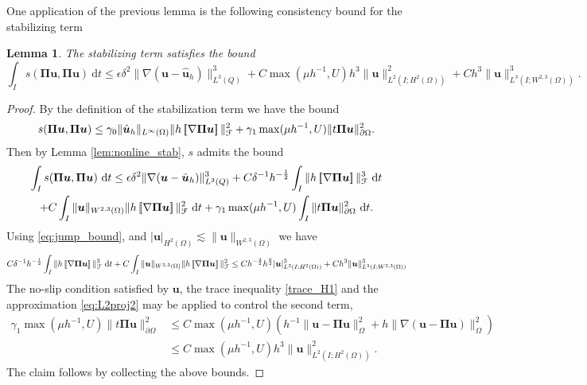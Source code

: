 \documentclass[10pt]{amsart}
\numberwithin{equation}{section}
\newtheorem{lemma}[theorem]{Lemma}
\theoremstyle{definition}
\theoremstyle{remark}
\renewcommand{\(}{\bigl(}
\renewcommand{\)}{\bigr)}
\newcommand{\jump}[1]{\left[\hspace{-0.025in}\left[#1\right]\hspace{-0.025in}\right]}
\newcommand{\bld}[1]{\boldsymbol{#1}}
\newcommand{\bu}{\bld{u}}
\newcommand{\bhu}{\hat{\bld{u}}}
\newcommand{\bPi}{\bld{\Pi}}
\begin{document}
%
One application of the previous lemma is the following consistency
bound for the stabilizing term
\begin{lemma}\label{lem:stab_consist}
The stabilizing term satisfies the bound
\[
\int_I s(\bPi \bu,\bPi \bu) ~\mbox{d}t \leq \epsilon
\delta^2 \|\nabla(\bu - \bhu_h)\|^3_{L^3(Q)}   + C \max(\mu h^{-1}, U)
 h^3 \|\bu\|_{L^2(I;H^2(\Omega))}^2 + C h^3  \|\bu\|_{L^3(I;W^{2,3}(\Omega))}^3.
\]
\end{lemma}
\begin{proof}
By the definition of the stabilization term we have the bound
\[
 s(\bPi \bu,\bPi \bu)\leq \gamma_0 \|
 \bhu_h\|_{L^{\infty}(\Omega)} \|h \jump{\nabla
   \bPi \bu}\|_{\mathcal{F}}^2 + \gamma_1 \max(\mu h^{-1}, U)\|t \bPi \bu\|^2_{\partial \Omega}.
\]
%
Then by Lemma \ref{lem:nonline_stab},
$s$ admits the bound
\begin{multline}\label{eq:stab_approx_nonlin}
\int_I  s(\bPi \bu,\bPi \bu) ~\mbox{d}t \leq \epsilon
\delta^2 \|\nabla (\bu - \bhu_h)\|^3_{L^3(Q)} + C
\delta^{-1} h^{-\frac{1}{2}}\int_I   \|h \jump{\nabla
   \bPi \bu}\|_{\mathcal{F}}^3 ~\mbox{d}t\\
 +C \int_I \|\bu\|_{W^{2,3}(\Omega)}\|h \jump{\nabla
   \bPi \bu}\|_{\mathcal{F}}^2 ~\mbox{d}t + \gamma_1 \max(\mu h^{-1},
 U) \int_I \|t \bPi \bu\|^2_{\partial \Omega} ~\mbox{d}t.
\end{multline}
Using \eqref{eq:jump_bound}, and $|\bu|_{H^2(\Omega)} \lesssim \|\bu\|_{W^{2,3}(\Omega)}$ we have
\[
C
\delta^{-1} h^{-\frac{1}{2}}\int_I   \|h \jump{\nabla
   \bPi \bu}\|_{\mathcal{F}}^3 ~\mbox{d}t
 +C \int_I \|\bu\|_{W^{2,3}(\Omega)}\|h \jump{\nabla
   \bPi \bu}\|_{\mathcal{F}}^2 \leq C h^{-\frac32} h^{\frac92}
 |\bu|_{L^2(I;H^2(\Omega))}^3 + C h^3  \|\bu\|_{L^3(I;W^{2,3}(\Omega))}^3 
\]
The no-slip condition satisfied by $\bu$, the trace inequality \eqref{trace_H1} and the
approximation \eqref{eq:L2proj2} may be applied to control the second term,
\begin{align*}
\gamma_1 \max(\mu h^{-1}, U)\|t \bPi \bu\|^2_{\partial \Omega} 
&\leq C
\max(\mu h^{-1}, U) (h^{-1} \|\bu - \bPi \bu\|^2_{ \Omega}  +
h  \|\nabla (\bu - \bPi \bu)\|^2_{ \Omega} ) 
\\
&\leq  C \max(\mu h^{-1}, U)
 h^3 \|\bu\|_{L^2(I;H^2(\Omega))}^2.
\end{align*}
The claim follows by collecting the above bounds.
\end{proof}
\end{document}
